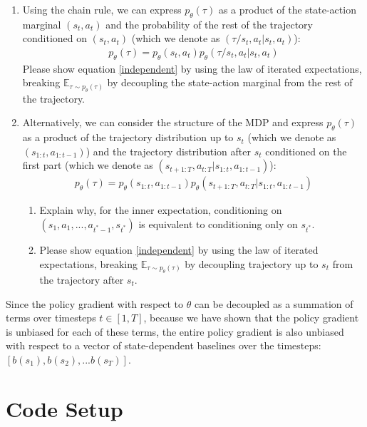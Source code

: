 \documentclass[12pt]{article}
\begin{document}
\begin{enumerate} [label=(\alph*)]
\item Using the chain rule, we can express $p_\theta(\tau)$ as a product of the state-action marginal $(s_t, a_t)$ and the probability of the rest of the trajectory conditioned on $(s_t, a_t)$ (which we denote as $(\tau / s_t, a_t | s_t, a_t)$):
    \begin{align*}
        p_\theta(\tau) = p_\theta(s_t, a_t)p_\theta(\tau / s_t, a_t | s_t, a_t)
    \end{align*}
    Please show equation \ref{independent} by using the law of iterated expectations, breaking $\mathbb{E}_{\tau \sim p_\theta(\tau)}$ by decoupling the state-action marginal from the rest of the trajectory.
\item Alternatively, we can consider the structure of the MDP and express $p_\theta(\tau)$ as a product of the trajectory distribution up to $s_t$ (which we denote as $(s_{1:t}, a_{1:t-1})$) and the trajectory distribution after $s_t$ conditioned on the first part (which we denote as $(s_{t+1:T}, a_{t:T} | s_{1:t}, a_{1:t-1})$):
    \begin{align*}
        p_\theta(\tau) = p_\theta(s_{1:t}, a_{1:t-1}) p_\theta(s_{t+1:T}, a_{t:T} | s_{1:t}, a_{1:t-1})
    \end{align*}
\begin{enumerate}
\item Explain why, for the inner expectation, conditioning on $(s_1, a_1, ..., a_{t^*-1}, s_{t^*})$ is equivalent to conditioning only on $s_{t^*}$.
\item Please show equation \ref{independent} by using the law of iterated expectations, breaking $\mathbb{E}_{\tau \sim p_\theta(\tau)}$ by decoupling trajectory up to $s_t$ from the trajectory after $s_t$.
\end{enumerate}
\end{enumerate}
Since the policy gradient with respect to $\theta$ can be decoupled as a summation of terms over timesteps $t \in [1, T]$, because we have shown that the policy gradient is unbiased for each of these terms,
the entire policy gradient is also unbiased with respect to a vector of state-dependent baselines over the timesteps: $[b(s_1), b(s_2), ... b(s_T)]$.

\section{Code Setup}
\end{document}
